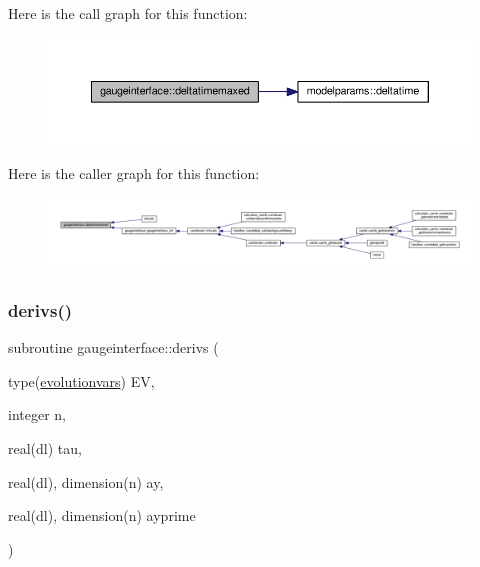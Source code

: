 Here is the call graph for this function\+:
\nopagebreak
\begin{figure}[H]
\begin{center}
\leavevmode
\includegraphics[width=350pt]{namespacegaugeinterface_aaf1e4804f8b140406e78f53f199433fa_cgraph}
\end{center}
\end{figure}
Here is the caller graph for this function\+:
\nopagebreak
\begin{figure}[H]
\begin{center}
\leavevmode
\includegraphics[width=350pt]{namespacegaugeinterface_aaf1e4804f8b140406e78f53f199433fa_icgraph}
\end{center}
\end{figure}
\mbox{\label{namespacegaugeinterface_a1d317261c83f3b5e84fe401ac2436d44}} 
\subsubsection{\texorpdfstring{derivs()}{derivs()}}
{\footnotesize\ttfamily subroutine gaugeinterface\+::derivs (\begin{DoxyParamCaption}\item[{type(\mbox{\hyperlink{structgaugeinterface_1_1evolutionvars}{evolutionvars}})}]{EV,  }\item[{integer}]{n,  }\item[{real(dl)}]{tau,  }\item[{real(dl), dimension(n)}]{ay,  }\item[{real(dl), dimension(n)}]{ayprime }\end{DoxyParamCaption})}



